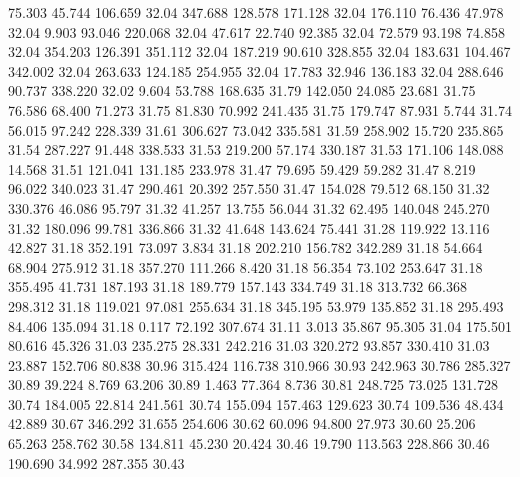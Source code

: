   75.303   45.744  106.659        32.04
 347.688  128.578  171.128        32.04
 176.110   76.436   47.978        32.04
   9.903   93.046  220.068        32.04
  47.617   22.740   92.385        32.04
  72.579   93.198   74.858        32.04
 354.203  126.391  351.112        32.04
 187.219   90.610  328.855        32.04
 183.631  104.467  342.002        32.04
 263.633  124.185  254.955        32.04
  17.783   32.946  136.183        32.04
 288.646   90.737  338.220        32.02
   9.604   53.788  168.635        31.79
 142.050   24.085   23.681        31.75
  76.586   68.400   71.273        31.75
  81.830   70.992  241.435        31.75
 179.747   87.931    5.744        31.74
  56.015   97.242  228.339        31.61
 306.627   73.042  335.581        31.59
 258.902   15.720  235.865        31.54
 287.227   91.448  338.533        31.53
 219.200   57.174  330.187        31.53
 171.106  148.088   14.568        31.51
 121.041  131.185  233.978        31.47
  79.695   59.429   59.282        31.47
   8.219   96.022  340.023        31.47
 290.461   20.392  257.550        31.47
 154.028   79.512   68.150        31.32
 330.376   46.086   95.797        31.32
  41.257   13.755   56.044        31.32
  62.495  140.048  245.270        31.32
 180.096   99.781  336.866        31.32
  41.648  143.624   75.441        31.28
 119.922   13.116   42.827        31.18
 352.191   73.097    3.834        31.18
 202.210  156.782  342.289        31.18
  54.664   68.904  275.912        31.18
 357.270  111.266    8.420        31.18
  56.354   73.102  253.647        31.18
 355.495   41.731  187.193        31.18
 189.779  157.143  334.749        31.18
 313.732   66.368  298.312        31.18
 119.021   97.081  255.634        31.18
 345.195   53.979  135.852        31.18
 295.493   84.406  135.094        31.18
   0.117   72.192  307.674        31.11
   3.013   35.867   95.305        31.04
 175.501   80.616   45.326        31.03
 235.275   28.331  242.216        31.03
 320.272   93.857  330.410        31.03
  23.887  152.706   80.838        30.96
 315.424  116.738  310.966        30.93
 242.963   30.786  285.327        30.89
  39.224    8.769   63.206        30.89
   1.463   77.364    8.736        30.81
 248.725   73.025  131.728        30.74
 184.005   22.814  241.561        30.74
 155.094  157.463  129.623        30.74
 109.536   48.434   42.889        30.67
 346.292   31.655  254.606        30.62
  60.096   94.800   27.973        30.60
  25.206   65.263  258.762        30.58
 134.811   45.230   20.424        30.46
  19.790  113.563  228.866        30.46
 190.690   34.992  287.355        30.43
